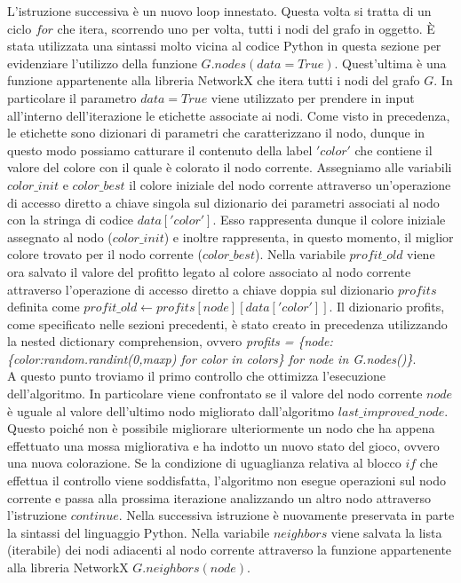 L'istruzione successiva è un nuovo loop innestato. Questa volta si tratta di un ciclo $for$ che itera, scorrendo uno per volta, tutti i nodi del grafo in oggetto. È stata utilizzata una sintassi molto vicina al codice Python in questa sezione per evidenziare l'utilizzo della funzione $G.nodes(data=True)$. Quest'ultima è una funzione appartenente alla libreria NetworkX che itera tutti i nodi del grafo $G$. In particolare il parametro $data=True$ viene utilizzato per prendere in input all'interno dell'iterazione le etichette associate ai nodi. Come visto in precedenza, le etichette sono dizionari di parametri che caratterizzano il nodo, dunque in questo modo possiamo catturare il contenuto della label $'color'$ che contiene il valore del colore con il quale è colorato il nodo corrente. Assegniamo alle variabili $color\_init$ e $color\_best$ il colore iniziale del nodo corrente attraverso un'operazione di accesso diretto a chiave singola sul dizionario dei parametri associati al nodo con la stringa di codice $data['color']$. Esso rappresenta dunque il colore iniziale assegnato al nodo ($color\_init$) e inoltre rappresenta, in questo momento, il miglior colore trovato per il nodo corrente ($color\_best$). Nella variabile $profit\_old$ viene ora salvato il valore del profitto legato al colore associato al nodo corrente attraverso l'operazione di accesso diretto a chiave doppia sul dizionario $profits$ definita come $profit\_old\gets profits[node][data['color']]$. Il dizionario profits, come specificato nelle sezioni precedenti, è stato creato in precedenza utilizzando la nested dictionary comprehension, ovvero \textit{profits = \{node:\{color:random.randint(0,maxp) for color in colors\} for node in G.nodes()\}}.\\
A questo punto troviamo il primo controllo che ottimizza l'esecuzione dell'algoritmo. In particolare viene confrontato se il valore del nodo corrente $node$ è uguale al valore dell'ultimo nodo migliorato dall'algoritmo $last\_improved\_node$. Questo poiché non è possibile migliorare ulteriormente un nodo che ha appena effettuato una mossa migliorativa e ha indotto un nuovo stato del gioco, ovvero una nuova colorazione. Se la condizione di uguaglianza relativa al blocco $if$ che effettua il controllo viene soddisfatta, l'algoritmo non esegue operazioni sul nodo corrente e passa alla prossima iterazione analizzando un altro nodo attraverso l'istruzione $continue$. Nella successiva istruzione è nuovamente preservata in parte la sintassi del linguaggio Python. Nella variabile $neighbors$ viene salvata la lista (iterabile) dei nodi adiacenti al nodo corrente attraverso la funzione appartenente alla libreria NetworkX $G.neighbors(node)$.\\
